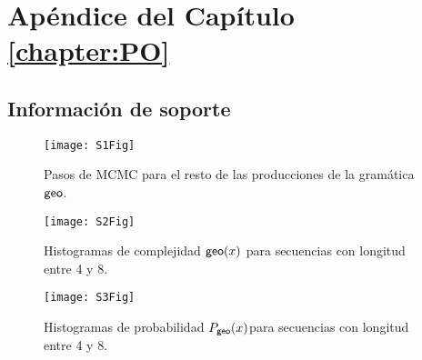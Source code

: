 \chapter{Apéndice del Capítulo \ref{chapter:PO}}\label{app:PO}

\section{Información de soporte}

\begin{figure}[htpb]
    \centering
    \texttt{[image: S1Fig]}
    \caption{Pasos de MCMC para el resto de las producciones de la gramática ${\sf geo}$.}
    \label{S1_Fig}
\end{figure}

\begin{figure}[htpb]
    \centering
    \texttt{[image: S2Fig]}
    \caption{Histogramas de complejidad ${\sf geo}(x)$ para secuencias con longitud entre 4 y 8.}
    \label{S2_Fig}
\end{figure}

\begin{figure}[htpb]
    \centering
    \texttt{[image: S3Fig]}
    \caption{Histogramas de probabilidad $P_{{\sf geo}}(x)$para secuencias con longitud entre 4 y 8.}
    \label{S3_Fig}
\end{figure}